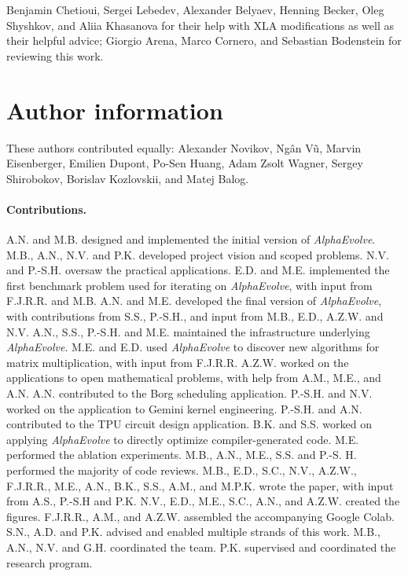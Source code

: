 \documentclass[logo,copyright,12pt]{googledeepmind}
\theoremstyle{definition}
\theoremstyle{remark}
\theoremstyle{plain}
\newcommand{\method}{\emph{AlphaEvolve}\xspace}
\begin{document}
Benjamin Chetioui, Sergei Lebedev, Alexander Belyaev, Henning Becker, Oleg Shyshkov, and Aliia Khasanova for their help with XLA modifications as well as their helpful advice; Giorgio Arena, Marco Cornero, and Sebastian Bodenstein for reviewing this work.



\section*{Author information}
\label{sec:authors}

These authors contributed equally: Alexander Novikov, Ngân Vũ, Marvin Eisenberger, Emilien Dupont, Po-Sen Huang, Adam Zsolt Wagner, Sergey Shirobokov, Borislav Kozlovskii, and Matej Balog.

\paragraph{Contributions.}
A.N. and M.B. designed and implemented the initial version of \method.
\;
M.B., A.N., N.V. and P.K. developed project vision and scoped problems.
\;
N.V. and P.-S.H. oversaw the practical applications.
\;
E.D. and M.E. implemented the first benchmark problem used for iterating on \method, with input from F.J.R.R. and M.B.
\;
A.N. and M.E. developed the final version of \method, with contributions from S.S., P.-S.H., and input from M.B., E.D., A.Z.W. and N.V.
\;
A.N., S.S., P.-S.H. and M.E. maintained the infrastructure underlying \method.
\;
M.E. and E.D. used \method to discover new algorithms for matrix multiplication, with input from F.J.R.R.
\;
A.Z.W. worked on the applications to open mathematical problems, with help from A.M., M.E., and A.N.
\;
A.N. contributed to the Borg scheduling application.
\;
P.-S.H. and N.V. worked on the application to Gemini kernel engineering.
\;
P.-S.H. and A.N. contributed to the TPU circuit design application.
\;
B.K. and S.S. worked on applying \method to directly optimize compiler-generated code.
\;
M.E. performed the ablation experiments.
\;
M.B., A.N., M.E., S.S. and P.-S. H. performed the majority of code reviews.
\;
M.B., E.D., S.C., N.V., A.Z.W., F.J.R.R., M.E., A.N., B.K., S.S., A.M., and M.P.K. wrote the paper, with input from A.S.,  P.-S.H and P.K.
\;
N.V., E.D., M.E., S.C., A.N., and A.Z.W. created the figures.
\;
F.J.R.R., A.M., and A.Z.W. assembled the accompanying Google Colab.
\;
S.N., A.D. and P.K. advised and enabled multiple strands of this work.
\;
M.B., A.N., N.V. and G.H. coordinated the team. 
\;
P.K. supervised and coordinated the research program. 
\end{document}
